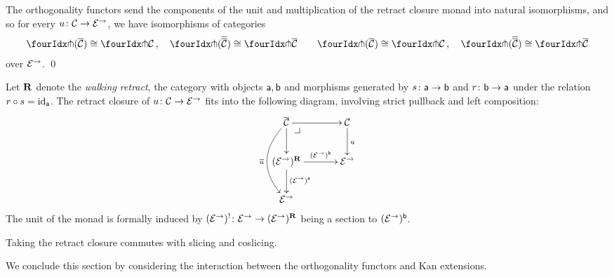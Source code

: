 \documentclass[reqno,10pt,a4paper,oneside]{amsart}
\begin{document}
\begin{proposition}
\label{retract-closure}
The orthogonality functors send the components of the unit and multiplication of the retract closure monad into natural
isomorphisms, and so for every $u \colon \mathcal{C} \to \mathcal{E}^\to$, we have isomorphisms of categories
\begin{gather*} 
 \liftr{(\overline{\cal{C}})} \iso \liftr{\cal{C}} \, , \quad
 \liftr{(\overline{\overline{\cal{C}}})} \iso \liftr{\overline{\cal{C}}}  \qquad
 \liftl{(\overline{\cal{C}})} \iso \liftl{\cal{C}} \, , \quad
 \liftl{(\overline{\overline{\cal{C}}})} \iso \liftl{\overline{\cal{C}}}
\end{gather*} 
over $\mathcal{E}^\to$. \qed
\end{proposition}




\begin{remark} Let $\mathbf{R}$ denote the \emph{walking retract}, \ie the category with objects $\mathsf{a}, \mathsf{b}$ and morphisms generated by $s \colon \mathsf{a} \to \mathsf{b}$ and $r \colon \mathsf{b} \to \mathsf{a}$ under the relation $r \mathbin{\circ} s = \operatorname{id}_{\mathsf{a}}$. The retract closure of $u \colon \mathcal{C} \to \mathcal{E}^\to$ fits into the following diagram, involving strict pullback and left composition:
\[
\xymatrix@C+1em{
  \overline{\cal{C}}
  \ar[r]
  \ar[d]
  \ar@/_2em/[dd]_{\overline{u}}
  \pullback{dr}
&
  \cal{C}
  \ar[d]^{u}
\\
  (\catE^{\to})^{\ret}
  \ar[r]^-{(\catE^{\to})^{\retB}}
  \ar[d]^{(\catE^{\to})^{\retA}}
&
  \catE^{\to}
\\
  \catE^{\to}
}
\]
The unit of the monad is formally induced by $(\mathcal{E}^{\to})^{\mathord{!}} \colon \mathcal{E}^{\to} \to (\mathcal{E}^{\to})^{\mathbf{R}}$ being a section to $(\mathcal{E}^{\to})^{\mathsf{b}}$.
\end{remark}


\begin{remark}
\label{retract-closure-slicing}
Taking the retract closure commutes with slicing and coslicing.
\end{remark}

\medskip

We conclude this section by considering the interaction between the orthogonality functors and  Kan extensions.
\end{document}
